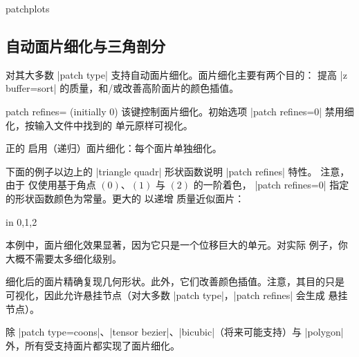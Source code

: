 {\begin{pgfplotslibrary}{patchplots}
\subsection{自动面片细化与三角剖分}
\label{sec:lib:patchplots:refinement}

\PGFPlots{} 对其大多数 |patch type| 支持自动面片细化。面片细化主要有两个目的：
提高 |z buffer=sort| 的质量，和/或改善高阶面片的颜色插值。

\begin{pgfplotskey}{patch refines= (initially 0)}
    该键控制面片细化。初始选项 |patch refines=0| 禁用细化，按输入文件中找到的
    单元原样可视化。

    正的  启用（递归）面片细化：每个面片单独细化。

    下面的例子以边上的 |triangle quadr| 形状函数说明 |patch refines| 特性。
    注意，由于 \PGFPlots{} 仅使用基于角点 $(0)$、$(1)$ 与 $(2)$ 的一阶着色，
    |patch refines=0| 指定的形状函数颜色为常量。更大的  以递增
    质量近似面片：
\begin{codeexample}[]
\foreach \level in {0,1,2} {%
}
\end{codeexample}
    \noindent 本例中，面片细化效果显著，因为它只是一个位移巨大的单元。对实际
    例子，你大概不需要太多细化级别。

    细化后的面片精确复现几何形状。此外，它们改善颜色插值。注意，其目的只是
    可视化，因此允许悬挂节点（对大多数 |patch type|，|patch refines| 会生成
    悬挂节点）。

    除 |patch type=coons|、|tensor bezier|、|bicubic|（将来可能支持）与
    |polygon| 外，所有受支持面片都实现了面片细化。
\end{pgfplotskey}


\end{pgfplotslibrary}}
